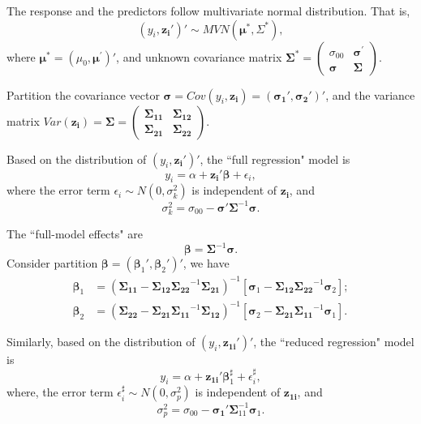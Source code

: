 \documentclass[11pt]{article}
\begin{document}
The response and the predictors follow multivariate normal distribution. That is, 
$$
(y_i, \boldsymbol{z_i}')' \sim MVN(\boldsymbol{\mu^*}, {\Sigma}^*),
$$
where $\boldsymbol{\mu^{*}}=(\mu_{0},\boldsymbol{\mu^{'}})'$, and unknown covariance matrix 
$ \boldsymbol{\Sigma^{*}}  =    
 \begin{pmatrix} 
    \sigma_{00} & \boldsymbol{\sigma^{'}} \\  
    \boldsymbol{\sigma} & \boldsymbol{\Sigma}
\end{pmatrix}$. 

Partition the covariance vector $\boldsymbol{\sigma} = Cov(y_i, \boldsymbol{z_i}) = (\boldsymbol{\sigma_1}', \boldsymbol{\sigma_2}')'$, and the variance matrix 
$Var(\boldsymbol{z_i}) =    \boldsymbol{\Sigma} = 
 \begin{pmatrix} 
    \boldsymbol{\Sigma_{11}} & \boldsymbol{\Sigma_{12}} \\  
    \boldsymbol{\Sigma_{21}} & \boldsymbol{\Sigma_{22}}
\end{pmatrix}$. 


Based on the distribution of $(y_i, \boldsymbol{z_i}')'$, the ``full regression" model is  
$$
y_i = \alpha + \boldsymbol{z_i}'\boldsymbol{\beta} + \epsilon_i,
$$
where the error term $\epsilon_i \sim N(0, \sigma^2_k)$ is independent of $\boldsymbol{z_i}$, 
and 
$$
\sigma^2_k = \sigma_{00} - \boldsymbol{\sigma}' \boldsymbol{\Sigma}^{-1} \boldsymbol{\sigma}.
$$
 
The ``full-model effects" are 
\begin{equation}
\label{eq:full.reg.coeff}
\boldsymbol{\beta} = \boldsymbol{\Sigma}^{-1}\boldsymbol{\sigma}. 
\end{equation}
Consider partition $\boldsymbol{\beta} = (\boldsymbol{\beta}_1', \boldsymbol{\beta}_2')'$, we have 
\begin{align*}
\boldsymbol{\beta}_1 &= ( \boldsymbol{\Sigma_{11}} -  \boldsymbol{\Sigma_{12}} \boldsymbol{\Sigma_{22}}^{-1}  \boldsymbol{\Sigma_{21}})^{-1}[\boldsymbol{\sigma}_1 -  \boldsymbol{\Sigma_{12}} \boldsymbol{\Sigma_{22}}^{-1}\boldsymbol{\sigma}_2]; \\
\boldsymbol{\beta}_2 &= ( \boldsymbol{\Sigma_{22}} -  \boldsymbol{\Sigma_{21}} \boldsymbol{\Sigma_{11}}^{-1}  \boldsymbol{\Sigma_{12}})^{-1}[\boldsymbol{\sigma}_2 -  \boldsymbol{\Sigma_{21}} \boldsymbol{\Sigma_{11}}^{-1}\boldsymbol{\sigma}_1].
\end{align*}

Similarly, based on the distribution of $(y_i, \boldsymbol{z_{1i}}')'$, the ``reduced regression" model is  
$$
y_i = \alpha + \boldsymbol{z_{1i}}'\boldsymbol{\beta}_1^\sharp + \epsilon_i^\sharp,
$$
where, the error term $\epsilon_i^\sharp \sim N(0, \sigma^2_p)$ is independent of $\boldsymbol{z_{1i}}$, and 
$$
\sigma^2_p = \sigma_{00} - \boldsymbol{\sigma_1}' \boldsymbol{\Sigma}_{11}^{-1} \boldsymbol{\sigma}_1.
$$
 
\end{document}
